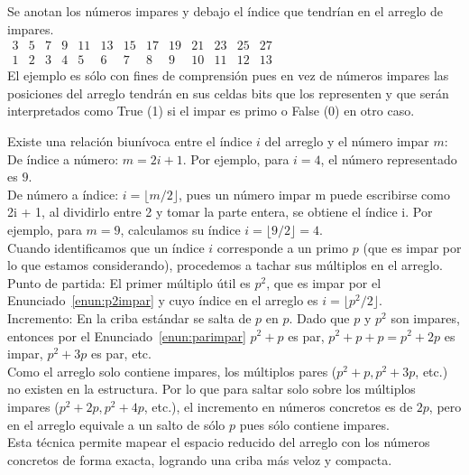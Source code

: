 \begin{ejemplo} Se anotan los números impares y debajo el índice que tendrían en el arreglo de impares. \\
$
\begin{array}{ccccccccccccc}
3 & 5 & 7 & 9 & 11 & 13 & 15 & 17 & 19 & 21 & 23 & 25 & 27 \\
{\scriptscriptstyle 1} & {\scriptscriptstyle 2} & {\scriptscriptstyle 3} & {\scriptscriptstyle 4} & {\scriptscriptstyle 5} & {\scriptscriptstyle 6} & {\scriptscriptstyle 7} & {\scriptscriptstyle 8} & {\scriptscriptstyle 9} & {\scriptscriptstyle 10} & {\scriptscriptstyle 11} & {\scriptscriptstyle 12} & {\scriptscriptstyle 13}
\end{array}
$ \\
El ejemplo es sólo con fines de comprensión pues en vez de números impares las posiciones del arreglo tendrán en sus celdas bits que los representen y que serán interpretados como True (1) si el impar es primo o False (0) en otro caso.
\end{ejemplo} 

Existe una relación biunívoca entre el índice $i$ del arreglo y el número impar $m$: \\
De índice a número: $m = 2i + 1$. Por ejemplo, para $i = 4$, el número representado es $9$. \\
De número a índice: $i = \lfloor m/2 \rfloor$, pues un número impar m puede escribirse como 2i + 1, al dividirlo entre 2 y tomar la parte entera, se obtiene el índice i. Por ejemplo, para $m = 9$, calculamos su índice $i = \lfloor 9/2 \rfloor = 4$. \\
Cuando identificamos que un índice $i$ corresponde a un primo $p$ (que es impar por lo que estamos considerando), procedemos a tachar sus múltiplos en el arreglo. \\

Punto de partida: El primer múltiplo útil es $p^2$, que es impar por el Enunciado~\ref{enun:p2impar} y cuyo índice en el arreglo es $i = \lfloor p^2/2 \rfloor$. \\
Incremento: En la criba estándar se salta de $p$ en $p$. Dado que $p$ y $p^2$ son impares, entonces por el Enunciado~\ref{enun:parimpar} $p^2 + p$ es par, $p^2+p+p= p^2+2p$ es impar, $p^2 + 3p$ es par, etc.\\
Como el arreglo solo contiene impares, los múltiplos pares ($p^2 + p, p^2 + 3p$, etc.) no existen en la estructura. Por lo que  para saltar solo sobre los múltiplos impares ($p^2 + 2p, p^2 + 4p$, etc.), el incremento en números concretos es de $2p$, pero en el arreglo equivale a un salto de sólo $p$ pues sólo contiene impares. \\
Esta técnica permite mapear el espacio reducido del arreglo con los números concretos de forma exacta, logrando una criba más veloz y compacta. \\

